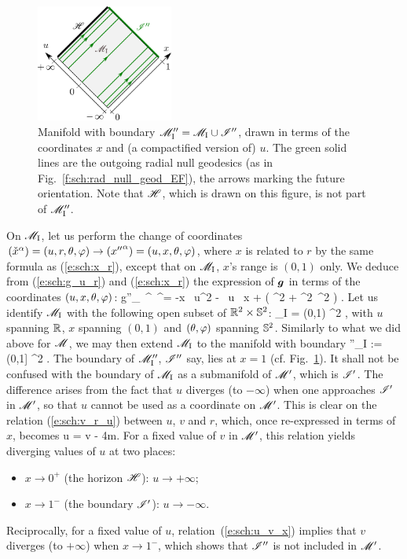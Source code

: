 \begin{figure}
\centerline{\includegraphics[width=0.4\textwidth]{sch_conf_compl2.pdf}}
\caption[]{\label{f:sch:conf_compl2} \footnotesize
Manifold with boundary
$\mathscr{M}''_{\rm I} = \mathscr{M}_{\rm I}\cup\mathscr{I}''$, drawn in terms of
the coordinates $x$ and (a compactified version of) $u$.
The green solid lines are the outgoing radial null geodesics (as in Fig.~\ref{f:sch:rad_null_geod_EF}), the arrows marking the future orientation.
Note that $\mathscr{H}$, which is drawn on this figure, is not part of $\mathscr{M}''_{\rm I}$.}
\end{figure}

On $\mathscr{M}_{\rm I}$, let us perform the change of coordinates
$(\check{x}^\alpha) = (u,r,\theta,\varphi) \rightarrow ({x''}^\alpha) = (u,x,\theta,\varphi)$,
where $x$ is related to $r$ by the same formula as (\ref{e:sch:x_r}),
except that on $\mathscr{M}_{\rm I}$, $x$'s range is $(0,1)$ only.
We deduce from (\ref{e:sch:g_u_r}) and (\ref{e:sch:x_r})
the expression of $\bm{g}$ in terms of the coordinates $(u,x,\theta,\varphi)$:
\be \label{e:sch:tilde_g_x_u}
        {g''}_{\mu\nu}\, ^\mu \, ^\nu =
            -x \, \D u^2
            - \, \D u \, \D x
        +   \left( \D\th^2 + \sin^2\th\, \D\ph^2 \right) .
\ee
Let us identify $\mathscr{M}_{\rm I}$ with the following open subset of
$\mathbb{R}^2\times \mathbb{S}^2$:
\be
    \M_{\rm I} = \R \times (0,1) \times \SS^2 ,
\ee
with $u$ spanning $\mathbb{R}$, $x$ spanning $(0,1)$ and $(\theta,\varphi)$
spanning $\mathbb{S}^2$. Similarly to what we did above for $\mathscr{M}$, we may then
extend $\mathscr{M}_{\rm I}$ to the manifold with boundary
\be
    \M''_{\rm I} :=  \R \times (0,1] \times \SS^2 .
\ee
The boundary of $\mathscr{M}''_{\rm I}$, $\mathscr{I}''$ say, lies at $x=1$
(cf. Fig.~\ref{f:sch:conf_compl2}). It shall not be
confused with the boundary of $\mathscr{M}_{\rm I}$ as a submanifold of $\mathscr{M}'$, which is
$\mathscr{I}'$. The difference arises from the fact that $u$ diverges (to $-\infty$)
when one approaches $\mathscr{I}'$ in $\mathscr{M}'$, so that $u$ cannot be used as a
coordinate on $\mathscr{M}'$. This is clear on the relation (\ref{e:sch:v_r_u})
between $u$, $v$ and $r$, which, once re-expressed in terms of $x$, becomes
\be \label{e:sch:u_v_x}
    u = v - 4m.
\ee
For a fixed value of $v$ in $\mathscr{M}'$, this relation yields diverging values of
$u$ at two places:
\begin{itemize}
\item $x\rightarrow 0^+$ (the horizon $\mathscr{H}$): $u\rightarrow +\infty$;
\item $x\rightarrow 1^-$ (the boundary $\mathscr{I}'$): $u\rightarrow -\infty$.
\end{itemize}
Reciprocally, for a fixed value of $u$, relation~(\ref{e:sch:u_v_x})
implies that $v$ diverges (to $+\infty$) when $x\rightarrow 1^-$, which shows that
$\mathscr{I}''$ is not included in $\mathscr{M}'$.

